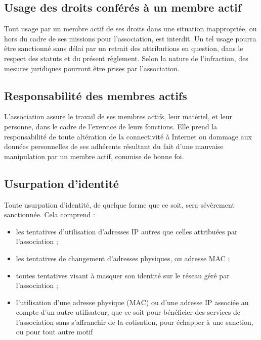 \documentclass[12pt]{article}
\begin{document}
    \subsection{Usage des droits conférés à un membre actif}

		Tout usage par un membre actif de ses droits dans une situation inappropriée, ou hors du cadre de ses missions pour l’association, est interdit. Un tel usage pourra être sanctionné sans délai par un retrait des attributions en question, dans le respect des statuts et du présent règlement. Selon la nature de l’infraction, des mesures juridiques pourront être prises par l’association.

    \subsection{Responsabilité des membres actifs}

		L’association assure le travail de ses membres actifs, leur matériel, et leur personne, dans le cadre de l’exercice de leurs fonctions. Elle prend la responsabilité de toute altération de la connectivité à Internet ou dommage aux données personnelles de ses adhérents résultant du fait d’une mauvaise manipulation par un membre actif, commise de bonne foi.

    \subsection{Usurpation d'identité}

		Toute usurpation d'identité, de quelque forme que ce soit, sera sévèrement sanctionnée. Cela comprend :

		\begin{itemize}
		    \item[\textbullet] les tentatives d'utilisation d'adresses IP autres que celles attribuées par l'association ;

		    \item[\textbullet] les tentatives de changement d'adresses physiques, ou adresse MAC ;

		    \item[\textbullet] toutes tentatives visant à masquer son identité sur le réseau géré par l'association ;

		    \item[\textbullet] l'utilisation d'une adresse physique (MAC) ou d'une adresse IP associée au compte d'un autre utilisateur, que ce soit pour bénéficier des services de l'association sans s'affranchir de la cotisation, pour échapper à une sanction, ou pour tout autre motif 
		\end{itemize}
\end{document}
